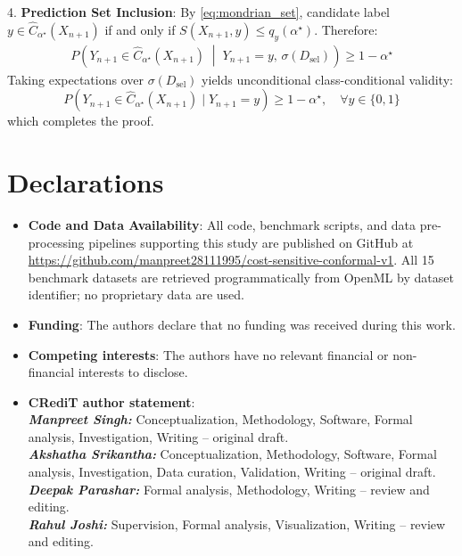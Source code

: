 \documentclass{ieeetj}
\begin{document}
\begin{IEEEproof}
4. \textbf{Prediction Set Inclusion}: By \eqref{eq:mondrian_set}, candidate label $y \in \hat{C}_{\alpha^\star}(X_{n+1})$ if and only if $S(X_{n+1}, y) \le q_y(\alpha^\star)$. Therefore:
\begin{align}
P\left(Y_{n+1} \in \hat{C}_{\alpha^\star}(X_{n+1}) \;\middle|\; Y_{n+1}=y, \, \sigma(D_{\mathrm{sel}})\right) \ge 1 - \alpha^\star
\end{align}
Taking expectations over $\sigma(D_{\mathrm{sel}})$ yields unconditional class-conditional validity:
\begin{equation}
P(Y_{n+1} \in \hat{C}_{\alpha^\star}(X_{n+1}) \mid Y_{n+1}=y) \ge 1 - \alpha^\star, \quad \forall y \in \{0, 1\}
\end{equation}
which completes the proof.
\end{IEEEproof}

\section*{Declarations}
\begin{itemize}
    \item \textbf{Code and Data Availability}: All code, benchmark scripts, and data pre-processing pipelines supporting this study are published on GitHub at \url{https://github.com/manpreet28111995/cost-sensitive-conformal-v1}. All 15 benchmark datasets are retrieved programmatically from OpenML by dataset identifier; no proprietary data are used.
    \item \textbf{Funding}: The authors declare that no funding was received during this work.
    \item \textbf{Competing interests}: The authors have no relevant financial or non-financial interests to disclose.
    \item \textbf{CRediT author statement}: \\
    \textit{\textbf{Manpreet Singh:}} Conceptualization, Methodology, Software, Formal analysis, Investigation, Writing -- original draft. \\
    \textit{\textbf{Akshatha Srikantha:}} Conceptualization, Methodology, Software, Formal analysis, Investigation, Data curation, Validation, Writing -- original draft. \\
    \textit{\textbf{Deepak Parashar:}} Formal analysis, Methodology, Writing -- review and editing. \\
    \textit{\textbf{Rahul Joshi:}} Supervision, Formal analysis, Visualization, Writing -- review and editing.
\end{itemize}
\end{document}
